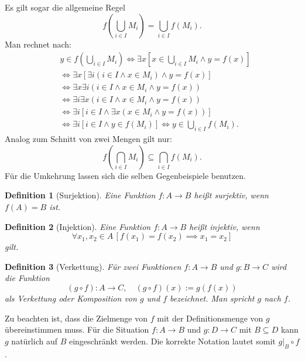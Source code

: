 \documentclass[a4paper,11pt,fleqn,twoside]{scrartcl}
\numberwithin{equation}{section}
\theoremstyle{rmbox}
\newtheorem{Definition}{Definition}
\begin{document}
Es gilt sogar die allgemeine Regel
\begin{equation}
f(\bigcup_{i\in I} M_i) = \bigcup_{i\in I} f(M_i).
\end{equation}
Man rechnet nach:
\begin{align}
& y\in f(\bigcup_{i\in I} M_i)
\iff \exists x[x\in\bigcup_{i\in I} M_i\land y=f(x)]\\
& \iff \exists x[\exists i(i\in I\land x\in M_i)\land y=f(x)]\\
& \iff \exists x\exists i(i\in I\land x\in M_i\land y=f(x))\\
& \iff \exists i\exists x(i\in I\land x\in M_i\land y=f(x))\\
& \iff \exists i[i\in I\land\exists x(x\in M_i\land y=f(x))]\\
& \iff \exists i[i\in I\land y\in f(M_i)]
\iff y\in \bigcup_{i\in I} f(M_i).
\end{align}
Analog zum Schnitt von zwei Mengen gilt nur:
\begin{equation}
f(\bigcap_{i\in I} M_i) \subseteq \bigcap_{i\in I} f(M_i).
\end{equation}
Für die Umkehrung lassen sich die selben Gegenbeispiele benutzen.

\begin{Definition}[Surjektion]
Eine Funktion $f\colon A\to B$ heißt \emph{surjektiv}, wenn $f(A)=B$ ist.
\end{Definition}

\begin{Definition}[Injektion]
Eine Funktion $f\colon A\to B$ heißt \emph{injektiv}, wenn
\begin{equation}
\forall x_1,x_2\in A\,[f(x_1)=f(x_2)\implies x_1=x_2]
\end{equation}
gilt.
\end{Definition}

\begin{Definition}[Verkettung]
Für zwei Funktionen $f\colon A\to B$ und $g\colon B\to C$ wird
die Funktion
\begin{equation}
(g\circ f)\colon A\to C,\quad (g\circ f)(x):=g(f(x))
\end{equation}
als \emph{Verkettung} oder \emph{Komposition} von $g$ und $f$
bezeichnet. Man spricht \emph{$g$ nach $f$}.
\end{Definition}

Zu beachten ist, dass die Zielmenge von $f$ mit der Definitionsmenge
von $g$ übereinstimmen muss. Für die Situation $f\colon A\to B$
und $g\colon D\to C$ mit $B\subseteq D$ kann $g$ natürlich auf
$B$ eingeschränkt werden. Die korrekte Notation lautet somit
$g|_B\circ f$.
\end{document}
